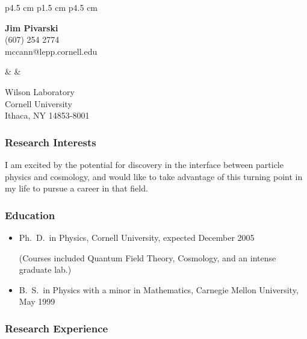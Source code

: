 \documentclass[12pt]{article}
\begin{document}
\begin{center}
  \begin{tabular}{p{4.5 cm} p{1.5 cm} p{4.5 cm}}
    \begin{minipage}{\linewidth}
      \begin{center}
	{\bf \large Jim Pivarski} \\
	(607) 254 2774 \\
	mccann@lepp.cornell.edu
      \end{center}
    \end{minipage} & &
    \begin{minipage}{\linewidth}
      Wilson Laboratory \\
      Cornell University \\
      Ithaca, NY 14853-8001
    \end{minipage}
  \end{tabular}
\end{center}

\subsubsection*{Research Interests}

I am excited by the potential for discovery in the interface between
particle physics and cosmology, and would like to take advantage of
this turning point in my life to pursue a career in that field.

\subsubsection*{Education}

\begin{itemize}

  \item Ph.\ D.\ in Physics, Cornell University, expected December 2005

    (Courses included Quantum Field Theory, Cosmology, and an intense
    graduate lab.)

  \item B.\ S.\ in Physics with a minor in Mathematics, Carnegie
    Mellon University, May 1999

\end{itemize}

\subsubsection*{Research Experience}
\end{document}
